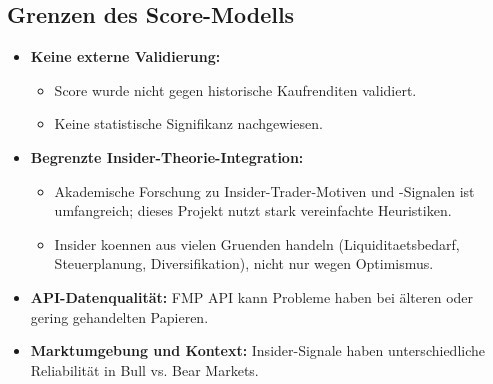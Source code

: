 \subsection{Grenzen des Score-Modells}
\begin{itemize}
  \item \textbf{Keine externe Validierung:} %
    \begin{itemize}
      \item Score wurde nicht gegen historische Kaufrenditen validiert.
      \item Keine statistische Signifikanz nachgewiesen.
    \end{itemize}
  \item \textbf{Begrenzte Insider-Theorie-Integration:} %
    \begin{itemize}
      \item Akademische Forschung zu Insider-Trader-Motiven und -Signalen ist umfangreich; dieses Projekt nutzt stark vereinfachte Heuristiken.
      \item Insider koennen aus vielen Gruenden handeln (Liquiditaetsbedarf, Steuerplanung, Diversifikation), nicht nur wegen Optimismus.
    \end{itemize}
  \item \textbf{API-Datenqualität:} FMP API kann Probleme haben bei älteren oder gering gehandelten Papieren. %
  \item \textbf{Marktumgebung und Kontext:} Insider-Signale haben unterschiedliche Reliabilität in Bull vs. Bear Markets. %
\end{itemize}
